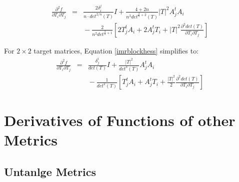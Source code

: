 \documentclass{report}
\begin{document}
\begin{eqnarray} \label{imrblockhess}
\frac{\partial^2 f}{\partial T_i \partial T_j} 
&=& \frac{2 \delta_i^j}{n \cdot det^{2/n}(T)} I
+ \frac{4 + 2n}{n^3 det^{\frac{2}{n}+2}(T)} |T|^2 A_j^t A_i \\ \nonumber
& & {} - \frac{2}{n^2 det^{\frac{2}{n}+1}} \left[ 
2 T_j^t A_i + 2 A_j^t T_i + |T|^2 \frac{\partial^2 det(T)}{\partial T_i \partial T_j} \right]
\end{eqnarray}



\noindent For $2 \times 2$ target matrices, Equation \ref{imrblockhess} simplifies to:
\begin{eqnarray}
\frac{\partial^2 f}{\partial T_i \partial T_j}
&=& \frac{\delta^i_j}{det(T)}I + \frac{|T|^2}{det^3(T)} A_j^t A_i \\ \nonumber
& & {} - \frac{1}{det^2(T)} \left[ T_j^t A_i + A_j^t T_i 
+ \frac{|T|^2}{2} \frac{\partial^2 det(T)}{\partial T_i \partial T_j} \right]
\end{eqnarray}

\chapter{Derivatives of Functions of other Metrics}

\section{Untanlge Metrics}
\end{document}
